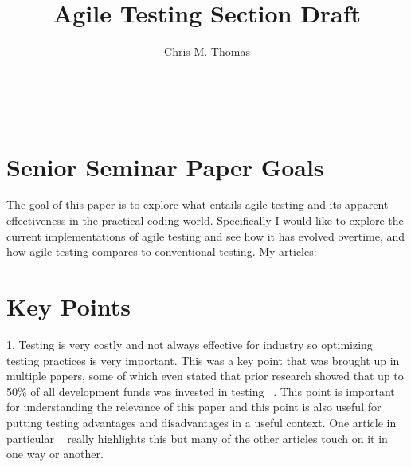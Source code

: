 \documentclass{sig-alternate}
\begin{document}

\title{Agile Testing Section Draft}


\author{
\alignauthor
Chris M. Thomas\\
	\\
	\\
	\\
}

\maketitle



\section{Senior Seminar Paper Goals}
The goal of this paper is to explore what entails agile testing and its apparent effectiveness in the practical coding world.  Specifically I would like to explore the current implementations of agile testing and see how it has evolved overtime, and how agile testing compares to conventional testing. My articles: ~\cite{George:2003, Schneider:2013, Lemos:2012, Hammond:2012, Soeken:2012, Kettunen:2010, Sawyer:2009, Bertolino:2007, Talby:2006, Hellman:2012}

\section{Key Points}
1. Testing is very costly and not always effective for industry so optimizing testing practices is very important.
This was a key point that was brought up in multiple papers, some of which even stated that prior research showed that up to 50\% of all development funds was invested in testing ~\cite{Bertolino:2007, Kettunen:2010}. This point is important for understanding the relevance of this paper and this point is also useful for putting testing advantages and disadvantages in a useful context.  One article in particular ~\cite{Bertolino:2007} really highlights this but many of the other articles touch on it in one way or another.
\end{document}
